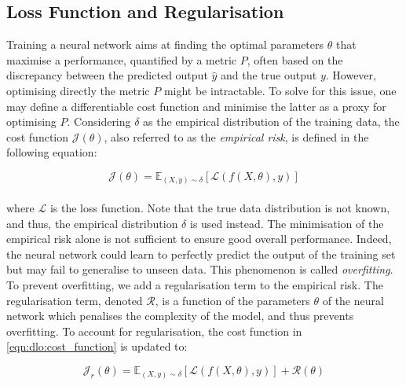 
\subsection{Loss Function and Regularisation}
Training a neural network aims at finding the optimal parameters $\theta$ that
maximise a performance, quantified by a metric $P$, often based on the
discrepancy between the predicted output $\hat{y}$ and the true output $y$.
However, optimising directly the metric $P$ might be intractable. To solve for
this issue, one may define a differentiable cost function and minimise the
latter as a proxy for optimising $P$. Considering $\delta$ as the empirical
distribution of the training data, the cost function $\mathcal{J}(\theta)$, also
referred to as the \emph{empirical risk}, is defined in the following equation:

\begin{equation}
  \label{eqn:dlo:cost_function}
  \mathcal{J}(\theta) = \mathds{E}_{(X, y) \sim \delta} \left[ \mathcal{L}(f(X,\theta), y) \right]
\end{equation}\\

\noindent where $\mathcal{L}$ is the loss function. Note that the true data
distribution is not known, and thus, the empirical distribution $\delta$ is used
instead. The minimisation of the empirical risk alone is not sufficient to
ensure good overall performance. Indeed, the neural network could learn to
perfectly predict the output of the training set but may fail to generalise to
unseen data. This phenomenon is called \emph{overfitting}. To prevent
overfitting, we add a regularisation term to the empirical risk. The
regularisation term, denoted $\mathcal{R}$, is a function of the parameters
$\theta$ of the neural network which penalises the complexity of the model, and
thus prevents overfitting. To account for regularisation, the cost function in
\cref{eqn:dlo:cost_function} is updated to:

\begin{equation}
  \label{eqn:dlo:regularised_cost_fn}
  \mathcal{J}_r(\theta) = \mathds{E}_{(X, y) \sim \delta} \left[ \mathcal{L}(f(X,\theta), y) \right] + \mathcal{R}(\theta) 
\end{equation}\\

